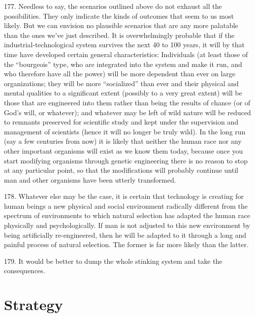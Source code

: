 \documentclass{article}
\begin{document}
177.  Needless to say, the scenarios outlined above do not exhaust all the possibilities.  They only 
indicate  the  kinds  of  outcomes  that  seem  to  us  most  likely.   But  we  can  envision  no  plausible  
scenarios  that  are  any  more  palatable  than  the  ones  we’ve  just  described.   It  is  overwhelmingly  
probable that if the industrial-technological system survives the next 40 to 100  years, it  will by 
that  time  have  developed  certain  general  characteristics:  Individuals  (at  least  those  of  the  
“bourgeois” type, who are integrated into the system and make it run, and who therefore have all 
the power) will be more dependent than ever on large organizations; they will be more “socialized” 
than ever and their physical and mental qualities to a significant extent (possibly to a very great 
extent) will be those that are engineered into them rather than being the results of chance (or of 
God’s  will,  or  whatever);  and  whatever  may  be  left  of  wild  nature  will  be  reduced  to  remnants  
preserved for scientific study and kept under the supervision and management of scientists (hence 
it  will  no  longer  be  truly  wild).   In  the  long  run  (say  a  few  centuries  from  now)  it  is  likely  that  
neither  the  human  race  nor  any  other  important  organisms  will  exist  as  we  know  them  today,  
because once you start modifying organisms through genetic engineering there is no reason to stop 
at  any  particular  point,  so  that  the  modifications  will  probably  continue  until  man  and  other  
organisms have been utterly transformed. \vspace{\baselineskip}

178.  Whatever else may be the case, it is certain that technology is creating for human beings a 
new  physical  and  social  environment  radically  different  from  the  spectrum  of  environments  to  
which natural selection has adapted the human race physically and psychologically.  If man is not 
adjusted to this new environment by being artificially re-engineered, then he will be adapted to it 
through  a  long  and  painful  process  of  natural  selection.   The  former  is  far  more  likely  than  the  
latter. \vspace{\baselineskip}

179.  It would be better to dump the whole stinking system and take the consequences. 


\section{Strategy}
\end{document}
